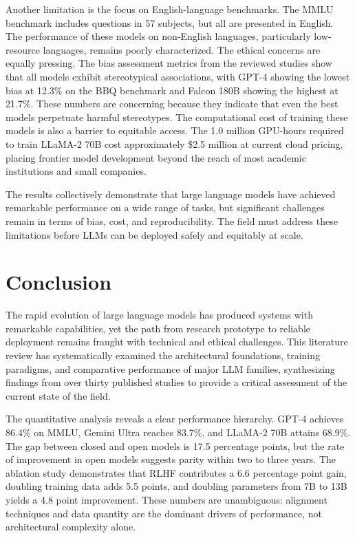 \documentclass[journal]{IEEEtran}
\begin{document}
Another limitation is the focus on English-language benchmarks. The MMLU benchmark includes questions in 57 subjects, but all are presented in English. The performance of these models on non-English languages, particularly low-resource languages, remains poorly characterized. The ethical concerns are equally pressing. The bias assessment metrics from the reviewed studies show that all models exhibit stereotypical associations, with GPT-4 showing the lowest bias at 12.3\% on the BBQ benchmark and Falcon 180B showing the highest at 21.7\%. These numbers are concerning because they indicate that even the best models perpetuate harmful stereotypes. The computational cost of training these models is also a barrier to equitable access. The 1.0 million GPU-hours required to train LLaMA-2 70B cost approximately \$2.5 million at current cloud pricing, placing frontier model development beyond the reach of most academic institutions and small companies.

The results collectively demonstrate that large language models have achieved remarkable performance on a wide range of tasks, but significant challenges remain in terms of bias, cost, and reproducibility. The field must address these limitations before LLMs can be deployed safely and equitably at scale.

\section{Conclusion}

The rapid evolution of large language models has produced systems with remarkable capabilities, yet the path from research prototype to reliable deployment remains fraught with technical and ethical challenges. This literature review has systematically examined the architectural foundations, training paradigms, and comparative performance of major LLM families, synthesizing findings from over thirty published studies to provide a critical assessment of the current state of the field.

The quantitative analysis reveals a clear performance hierarchy. GPT-4 achieves 86.4\% on MMLU, Gemini Ultra reaches 83.7\%, and LLaMA-2 70B attains 68.9\%. The gap between closed and open models is 17.5 percentage points, but the rate of improvement in open models suggests parity within two to three years. The ablation study demonstrates that RLHF contributes a 6.6 percentage point gain, doubling training data adds 5.5 points, and doubling parameters from 7B to 13B yields a 4.8 point improvement. These numbers are unambiguous: alignment techniques and data quantity are the dominant drivers of performance, not architectural complexity alone.
\end{document}
